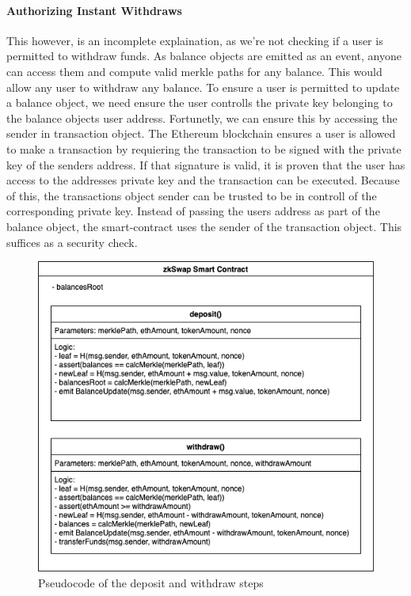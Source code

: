 \documentclass[../../thesis.tex]{subfiles}
\begin{document}
\paragraph{Authorizing Instant Withdraws}
This however, is an incomplete explaination, as we're not checking if a user is permitted to withdraw funds. As balance objects are emitted as an event, anyone can access them and compute valid merkle paths for any balance. This would allow any user to withdraw any balance. To ensure a user is permitted to update a balance object, we need ensure the user controlls the private key belonging to the balance objects user address. Fortunetly, we can ensure this by accessing the sender in transaction object. The Ethereum blockchain ensures a user is allowed to make a transaction by requiering the transaction to be signed with the private key of the senders address. If that signature is valid, it is proven that the user has access to the addresses private key and the transaction can be executed. Because of this, the transactions object sender can be trusted to be in controll of the corresponding private key. Instead of passing the users address as part of the balance object, the smart-contract uses the sender of the transaction object. This suffices as a security check.


\begin{figure}[h]
    \centerline{\includegraphics[totalheight=8cm]{diagrams/deposit.png}}
    \caption{Pseudocode of the deposit and withdraw steps}
    \label{fig:dep_with}
\end{figure}
\end{document}
